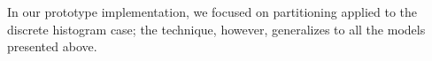 In our prototype implementation, we focused on partitioning applied to the discrete histogram case; the technique, however, generalizes to all the models presented above.

